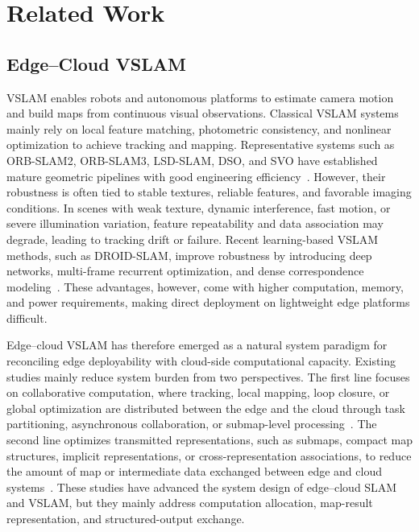 \documentclass[journal]{IEEEtran}
\begin{document}
\section{Related Work}
\label{sec:related_work}


\subsection{Edge--Cloud VSLAM}

VSLAM enables robots and autonomous platforms to estimate camera motion and build maps from continuous visual observations. Classical VSLAM systems mainly rely on local feature matching, photometric consistency, and nonlinear optimization to achieve tracking and mapping. Representative systems such as ORB-SLAM2, ORB-SLAM3, LSD-SLAM, DSO, and SVO have established mature geometric pipelines with good engineering efficiency~\cite{murartal2017orbslam2,campos2021orbslam3,engel2014lsdslam,engel2018dso,forster2014svo}. However, their robustness is often tied to stable textures, reliable features, and favorable imaging conditions. In scenes with weak texture, dynamic interference, fast motion, or severe illumination variation, feature repeatability and data association may degrade, leading to tracking drift or failure. Recent learning-based VSLAM methods, such as DROID-SLAM, improve robustness by introducing deep networks, multi-frame recurrent optimization, and dense correspondence modeling~\cite{teed2021droidslam}. These advantages, however, come with higher computation, memory, and power requirements, making direct deployment on lightweight edge platforms difficult.

Edge--cloud VSLAM has therefore emerged as a natural system paradigm for reconciling edge deployability with cloud-side computational capacity. Existing studies mainly reduce system burden from two perspectives. The first line focuses on collaborative computation, where tracking, local mapping, loop closure, or global optimization are distributed between the edge and the cloud through task partitioning, asynchronous collaboration, or submap-level processing~\cite{rabaud2011c2tam,kuffner2010cloud,shankar2020fogros,chen2024reviewcloudedge,chen2024cloudlearning,chen2024implicittransmission}. The second line optimizes transmitted representations, such as submaps, compact map structures, implicit representations, or cross-representation associations, to reduce the amount of map or intermediate data exchanged between edge and cloud systems~\cite{chen2024reviewcloudedge,chen2024implicittransmission,huo2025vcslam,chen2024crossdata,chen2025xrepslam}. These studies have advanced the system design of edge--cloud SLAM and VSLAM, but they mainly address computation allocation, map-result representation, and structured-output exchange.
\end{document}
